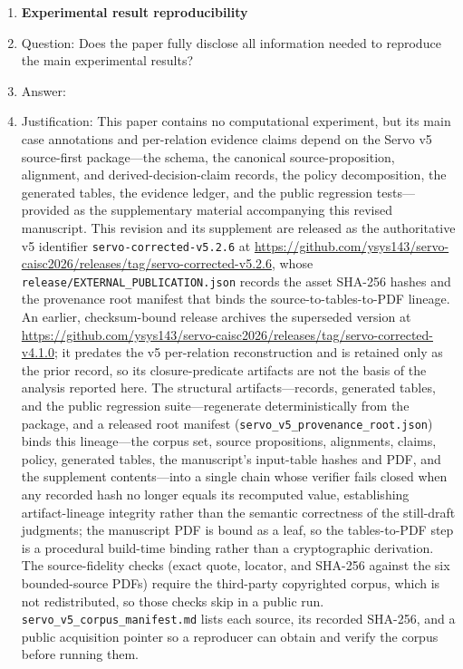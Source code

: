 \documentclass{article}
\begin{document}
\begin{enumerate}
\item {\bf Experimental result reproducibility}
    \item[] Question: Does the paper fully disclose all information needed to reproduce the main experimental results?
    \item[] Answer: \answerYes{}
    \item[] Justification: This paper contains no computational experiment, but its main case annotations and per-relation evidence claims depend on the Servo v5 source-first package---the schema, the canonical source-proposition, alignment, and derived-decision-claim records, the policy decomposition, the generated tables, the evidence ledger, and the public regression tests---provided as the supplementary material accompanying this revised manuscript. This revision and its supplement are released as the authoritative v5 identifier \texttt{servo-corrected-v5.2.6} at \url{https://github.com/ysys143/servo-caisc2026/releases/tag/servo-corrected-v5.2.6}, whose \texttt{release/EXTERNAL\_PUBLICATION.json} records the asset SHA-256 hashes and the provenance root manifest that binds the source-to-tables-to-PDF lineage. An earlier, checksum-bound release archives the superseded version at \url{https://github.com/ysys143/servo-caisc2026/releases/tag/servo-corrected-v4.1.0}; it predates the v5 per-relation reconstruction and is retained only as the prior record, so its closure-predicate artifacts are not the basis of the analysis reported here. The structural artifacts---records, generated tables, and the public regression suite---regenerate deterministically from the package, and a released root manifest (\texttt{servo\_v5\_provenance\_root.json}) binds this lineage---the corpus set, source propositions, alignments, claims, policy, generated tables, the manuscript's input-table hashes and PDF, and the supplement contents---into a single chain whose verifier fails closed when any recorded hash no longer equals its recomputed value, establishing artifact-lineage integrity rather than the semantic correctness of the still-draft judgments; the manuscript PDF is bound as a leaf, so the tables-to-PDF step is a procedural build-time binding rather than a cryptographic derivation. The source-fidelity checks (exact quote, locator, and SHA-256 against the six bounded-source PDFs) require the third-party copyrighted corpus, which is not redistributed, so those checks skip in a public run. \texttt{servo\_v5\_corpus\_manifest.md} lists each source, its recorded SHA-256, and a public acquisition pointer so a reproducer can obtain and verify the corpus before running them.


\end{enumerate}
\end{document}
